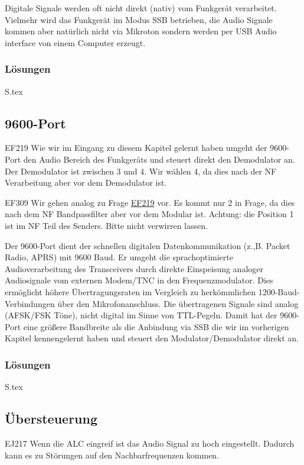 \documentclass[10pt,a4paper,ngerman]{article}
\theoremstyle{definition}
\theoremstyle{plain}
\theoremstyle{mytheorem}
\newcommand{\qref}[1]{\hyperref[#1]{#1}}
\theoremstyle{definition}
\newenvironment{ohmchapter}{}
{
  \subsubsection*{Lösungen}
  S\arabic{subsection}.tex}
}
\begin{document}
\begin{ohmchapter}
  Digitale Signale werden oft nicht direkt (nativ) vom Funkgerät verarbeitet.
  Vielmehr wird das Funkgerät im Modus SSB betrieben, die Audio Signale kommen aber natürlich nicht via Mikroton sondern werden per USB Audio interface von einem Computer erzeugt.
\end{ohmchapter}


\subsection{9600-Port }

\begin{sol}{EF219}
Wie wir im Eingang zu diesem Kapitel gelernt haben umgeht der 9600-Port den Audio Bereich des Funkgeräts und steuert direkt den Demodulator an. Der Demodulator ist zwischen 3 und 4. Wir wählen 4, da dies nach der NF Verarbeitung aber vor dem Demodulator ist.
\end{sol}

\begin{sol}{EF309}
Wir gehen analog zu Frage \qref{EF219} vor. Es kommt nur 2 in Frage, da dies nach dem NF Bandpassfilter aber vor dem Modular ist. Achtung: die Position 1 ist im NF Teil des Senders. Bitte nicht verwirren lassen.
\end{sol}

\begin{ohmchapter}
Der 9600-Port dient der schnellen digitalen Datenkommunikation (z.,B. Packet Radio, APRS) mit 9600 Baud. Er umgeht die sprachoptimierte Audioverarbeitung des Transceivers durch direkte Einspeisung analoger Audiosignale vom externen Modem/TNC in den Frequenzmodulator. Dies ermöglicht höhere Übertragungsraten im Vergleich zu herkömmlichen 1200-Baud-Verbindungen über den Mikrofonanschluss. Die übertragenen Signale sind analog (AFSK/FSK Töne), nicht digital im Sinne von TTL-Pegeln.
Damit hat der 9600-Port eine größere Bandbreite als die Anbindung via SSB die wir im vorherigen Kapitel kennengelernt haben und steuert den Modulator/Demodulator direkt an.
\end{ohmchapter}






\subsection{Übersteuerung }

\begin{sol}{EJ217}
  Wenn die ALC eingreif ist das Audio Signal zu hoch eingestellt. Dadurch kann es zu Störungen auf den Nachbarfrequenzen kommen.
\end{sol}
\end{document}
